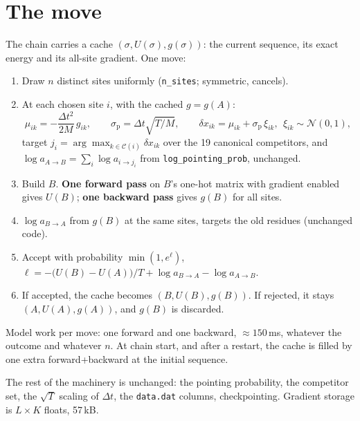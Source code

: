 \documentclass[11pt,a4paper]{article}
\newcommand{\dt}{\Delta t}
\newcommand{\Mass}{M}
\newcommand{\file}[1]{\texttt{#1}}
\begin{document}
\section{The move}\label{sec:proposal}
The chain carries a cache $(\sigma, U(\sigma), g(\sigma))$: the current sequence,
its exact energy and its all-site gradient. One move:
\begin{enumerate}
  \item Draw $n$ distinct sites uniformly (\texttt{n\_sites}; symmetric,
        cancels).
  \item At each chosen site $i$, with the cached $g=g(A)$:
        \begin{equation}
          \mu_{ik}=-\frac{\dt^2}{2\Mass}\,g_{ik},\qquad
          \sigma_{\mathrm{p}}=\dt\sqrt{T/\Mass},\qquad
          \delta x_{ik}=\mu_{ik}+\sigma_{\mathrm{p}}\,\xi_{ik},\ \ \xi_{ik}\sim\mathcal N(0,1),
        \end{equation}
        target $j_i=\arg\max_{k\in\mathcal C(i)}\delta x_{ik}$ over the 19
        canonical competitors, and $\log a_{A\to B}=\sum_i\log a_{i\to j_i}$ from
        \texttt{log\_pointing\_prob}, unchanged.
  \item Build $B$. \textbf{One forward pass} on $B$'s one-hot matrix with
        gradient enabled gives $U(B)$; \textbf{one backward pass} gives $g(B)$
        for all sites.
  \item $\log a_{B\to A}$ from $g(B)$ at the same sites, targets the old
        residues (unchanged code).
  \item Accept with probability $\min(1,e^{\ell})$,
        $\ell=-\bigl(U(B)-U(A)\bigr)/T+\log a_{B\to A}-\log a_{A\to B}$.
  \item If accepted, the cache becomes $(B,U(B),g(B))$. If rejected, it stays
        $(A,U(A),g(A))$, and $g(B)$ is discarded.
\end{enumerate}
Model work per move: one forward and one backward, $\approx150$\,ms, whatever
the outcome and whatever $n$. At chain start, and after a restart, the cache is
filled by one extra forward+backward at the initial sequence.

The rest of the machinery is unchanged: the pointing probability, the
competitor set, the $\sqrt{T}$ scaling of $\dt$, the \file{data.dat} columns,
checkpointing. Gradient storage is $L\times K$ floats, 57\,kB.

\end{document}
